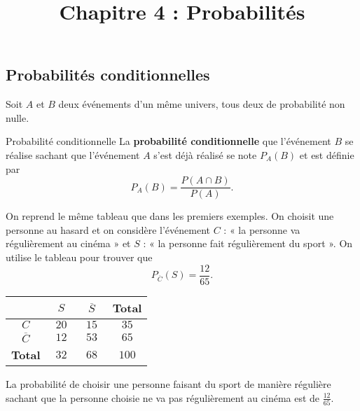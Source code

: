 \documentclass[11pt]{article}
\title{Chapitre 4 : Probabilités}
\date{}
\author{}
\begin{document}

%

\setcounter{page}{4}
\setcounter{defis}{5}
\setcounter{props}{3}
\setcounter{exemples}{11}
\setcounter{section}{2}
\setcounter{subsection}{1}

\subsection{Probabilités conditionnelles}
Soit $A$ et $B$ deux événements d'un même univers, tous deux de probabilité non
nulle.
\begin{defi}{Probabilité conditionnelle}
  La \textbf{probabilité conditionnelle} que l'événement $B$ se réalise sachant
  que l'événement $A$ s'est déjà réalisé se note $P_A(B)$ et est définie par
  \[
    P_A(B) = \frac{P\left( A\cap B \right)}{P\left( A \right)}.
  \]
\end{defi}
\begin{exemple}
 \begin{minipage}{.5\textwidth}
   On reprend le même tableau que dans les premiers exemples. On choisit une
   personne au hasard et on considère l'événement $C$ : « la personne va
   régulièrement au cinéma » et $S$ : « la personne fait régulièrement du sport
   ». On utilise le tableau pour trouver que
   \[
     P_{\overline C}\left( S \right) = \frac{12}{65}.
   \]
\end{minipage}
\begin{minipage}{.5\textwidth}
\begin{center}
\renewcommand{\arraystretch}{2}
\begin{tabular}{|c|c|c|c|}
  \cline{2-4}
  \multicolumn{1}{c|}{} & $\;\;S\;\;$ & $\;\;\overline S\;\;$ & \textbf{Total} \\
  \hline
  $C$ & $20$ & $15$ & $35$ \\
  \hline
  $\overline C$ & $12$ & $53$ & $65$ \\
  \hline
  \textbf{Total} & $32$ & $68$ & $100$ \\
  \hline
\end{tabular}
\end{center}
\end{minipage} 
La probabilité de choisir une personne faisant du sport de manière régulière
sachant que la personne choisie ne va pas régulièrement au cinéma est de
$\frac{12}{65}$.
\end{exemple}
\end{document}
